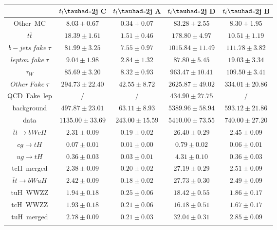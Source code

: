 \centering
\begin{tabular}{ccccc} \toprule\toprule
 & $t_{l}\tauhad$-2j C & $t_{l}\tauhad$-2j A & $t_{l}\tauhad$-2j D & $t_{l}\tauhad$-2j B\\\midrule
Other~MC & $8.03\pm0.67$ & $0.34\pm0.07$ & $83.28\pm2.55$ & $8.30\pm1.95$\\
$t\bar{t}$ & $18.39\pm1.61$ & $1.51\pm0.46$ & $178.80\pm4.97$ & $10.51\pm1.19$\\
$b-jets~fake~\tau$ & $81.99\pm3.25$ & $7.55\pm0.97$ & $1015.84\pm11.49$ & $111.78\pm3.82$\\
$lepton~fake~\tau$ & $9.04\pm1.98$ & $2.84\pm1.32$ & $87.80\pm5.45$ & $19.03\pm3.34$\\
$\tau_{W}$ & $85.69\pm3.20$ & $8.32\pm0.93$ & $963.47\pm10.41$ & $109.50\pm3.41$\\
$Other~Fake~\tau$ & $294.73\pm22.40$ & $42.55\pm8.72$ & $2625.87\pm49.02$ & $334.01\pm20.86$\\
QCD~Fake~lep &  / &  / & $434.90\pm27.75$ &  /\\
background & $497.87\pm23.01$ & $63.11\pm8.93$ & $5389.96\pm58.94$ & $593.12\pm21.86$\\
data & $1135.00\pm33.69$ & $243.00\pm15.59$ & $5410.00\pm73.55$ & $740.00\pm27.20$\\
$\bar{t}t\to bWcH$ & $2.31\pm0.09$ & $0.19\pm0.02$ & $26.40\pm0.29$ & $2.45\pm0.09$\\
$cg\to tH$ & $0.07\pm0.01$ & $0.01\pm0.00$ & $0.79\pm0.02$ & $0.06\pm0.01$\\
$ug\to tH$ & $0.36\pm0.03$ & $0.03\pm0.01$ & $4.31\pm0.10$ & $0.36\pm0.03$\\
tcH~merged & $2.38\pm0.09$ & $0.20\pm0.02$ & $27.19\pm0.29$ & $2.51\pm0.09$\\
$\bar{t}t\to bWuH$ & $2.42\pm0.09$ & $0.18\pm0.02$ & $27.73\pm0.30$ & $2.49\pm0.09$\\
tuH~WWZZ & $1.94\pm0.18$ & $0.25\pm0.06$ & $18.42\pm0.55$ & $1.86\pm0.17$\\
tcH~WWZZ & $1.93\pm0.18$ & $0.21\pm0.06$ & $16.18\pm0.51$ & $1.67\pm0.17$\\
tuH~merged & $2.78\pm0.09$ & $0.21\pm0.03$ & $32.04\pm0.31$ & $2.85\pm0.09$\\
\bottomrule\bottomrule\\
\end{tabular}
